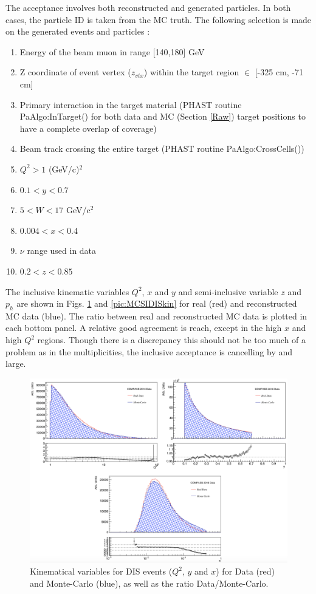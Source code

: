 The acceptance involves both reconstructed and generated particles. In both cases, the particle ID is taken from the MC truth. The following selection is made on the generated events and particles :

\begin{enumerate}
  \item Energy of the beam muon in range [140,180] GeV
	\item Z coordinate of event vertex ($z_{vtx}$) within the target region $\in$ [-325 cm, -71 cm]
	\item Primary interaction in the target material (PHAST routine PaAlgo:InTarget() for both data and MC (Section \ref{Raw}) target positions
				to have a complete overlap of coverage)
	\item Beam track crossing the entire target (PHAST routine PaAlgo:CrossCells())
  \item $Q^2>1$ (GeV/c)$^2$
  \item $0.1 < y < 0.7$
	\item $5 < W < 17$ GeV/c$^2$
  \item $0.004 < x < 0.4$
  \item $\nu$ range used in data
  \item $0.2 < z < 0.85$
\end{enumerate}

The inclusive kinematic variables $Q^2$, $x$ and $y$ and semi-inclusive variable $z$ and $p_h$ are shown in Figs. \ref{pic:MCDISkin} and \ref{pic:MCSIDISkin} for real (red) and reconstructed MC data (blue). The ratio between real and reconstructed MC data is plotted in each bottom panel. A relative good agreement is reach, except in the high $x$ and high $Q^2$ regions. Though there is a discrepancy this should not be too much of a problem as in the multiplicities, the inclusive acceptance is cancelling by and large.

\begin{figure}[!h]
	\includegraphics[scale=0.5]{./gfx/DIS_kin.png}
	\caption{Kinematical variables for DIS events ($Q^2$, $y$ and $x$) for Data (red) and Monte-Carlo (blue), as well as the ratio Data/Monte-Carlo.}
	\label{pic:MCDISkin}
\end{figure}

